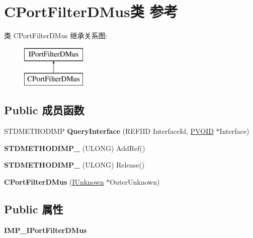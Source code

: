 \hypertarget{class_c_port_filter_d_mus}{}\section{C\+Port\+Filter\+D\+Mus类 参考}
\label{class_c_port_filter_d_mus}
类 C\+Port\+Filter\+D\+Mus 继承关系图\+:\begin{figure}[H]
\begin{center}
\leavevmode
\includegraphics[height=2.000000cm]{class_c_port_filter_d_mus}
\end{center}
\end{figure}
\subsection*{Public 成员函数}
\begin{DoxyCompactItemize}
\item 
\mbox{\label{class_c_port_filter_d_mus_a71de483dfd9e1b48c9c5dea81bb8e8ac}} 
S\+T\+D\+M\+E\+T\+H\+O\+D\+I\+MP {\bfseries Query\+Interface} (R\+E\+F\+I\+ID Interface\+Id, \hyperlink{interfacevoid}{P\+V\+O\+ID} $\ast$Interface)
\item 
\mbox{\label{class_c_port_filter_d_mus_abd6357a8ed854997be4bb00906542960}} 
{\bfseries S\+T\+D\+M\+E\+T\+H\+O\+D\+I\+M\+P\+\_\+} (U\+L\+O\+NG) Add\+Ref()
\item 
\mbox{\label{class_c_port_filter_d_mus_a5eb85489a6cc7a914105022bf6092258}} 
{\bfseries S\+T\+D\+M\+E\+T\+H\+O\+D\+I\+M\+P\+\_\+} (U\+L\+O\+NG) Release()
\item 
\mbox{\label{class_c_port_filter_d_mus_a16a81c3fcb172c4b34b21cb8166c4d6e}} 
{\bfseries C\+Port\+Filter\+D\+Mus} (\hyperlink{interface_i_unknown}{I\+Unknown} $\ast$Outer\+Unknown)
\end{DoxyCompactItemize}
\subsection*{Public 属性}
\begin{DoxyCompactItemize}
\item 
\mbox{\label{class_c_port_filter_d_mus_a7f748e1ad0f14b9f979058cc7fb30638}} 
{\bfseries I\+M\+P\+\_\+\+I\+Port\+Filter\+D\+Mus}
\end{DoxyCompactItemize}
